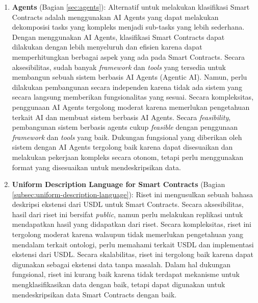 \begin{enumerate}
	\item \textbf{Agents} (Bagian \ref{sec:agents}): Alternatif untuk melakukan klasifikasi Smart Contracts adalah menggunakan AI Agents yang dapat melakukan dekomposisi tasks yang kompleks menjadi sub-tasks yang lebih sederhana. Dengan menggunakan AI Agents, klasifikasi Smart Contracts dapat dilakukan dengan lebih menyeluruh dan efisien karena dapat memperhitungkan berbagai aspek yang ada pada Smart Contracts. Secara aksesibilitas, sudah banyak \textit{framework} dan \textit{tools} yang tersedia untuk membangun sebuah sistem berbasis AI Agents (Agentic AI). Namun, perlu dilakukan pembangunan secara independen karena tidak ada sistem yang secara langsung memberikan fungsionalitas yang sesuai. Secara kompleksitas, penggunaan AI Agents tergolong moderat karena memerlukan pengetahuan terkait AI dan membuat sistem berbasis AI Agents. Secara \textit{feasibility}, pembangunan sistem berbasis agents cukup \textit{feasible} dengan penggunaan \textit{framework} dan \textit{tools} yang baik. Dukungan fungsional yang diberikan oleh sistem dengan AI Agents tergolong baik karena dapat disesuaikan dan melakukan pekerjaan kompleks secara otonom, tetapi perlu menggunakan format yang disesuaikan untuk mendeskripsikan data.

	\item \textbf{Uniform Description Language for Smart Contracts} \parencite{udlsc} (Bagian \ref{subsec:uniform-description-language}): Riset ini mengusulkan sebuah bahasa deskripsi ekstensi dari USDL untuk Smart Contracts. Secara aksesibilitas, hasil dari riset ini bersifat \textit{public}, namun perlu melakukan replikasi untuk mendapatkan hasil yang didapatkan dari riset. Secara kompleksitas, riset ini tergolong moderat karena walaupun tidak memerlukan pengetahuan yang mendalam terkait ontologi, perlu memahami terkait USDL dan implementasi ekstensi dari USDL. Secara skalabilitas, riset ini tergolong baik karena dapat digunakan sebagai ekstensi data tanpa masalah. Dalam hal dukungan fungsional, riset ini kurang baik karena tidak terdapat mekanisme untuk mengklasifikasikan data dengan baik, tetapi dapat digunakan untuk mendeskripsikan data Smart Contracts dengan baik.


\end{enumerate}
